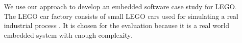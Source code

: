 We use our approach to develop an embedded software case study for LEGO. %
The LEGO car factory consists of small LEGO cars used for simulating a real industrial process \cite{lego}.
It is chosen for the evaluation because it is a real world embedded system with enough complexity.

